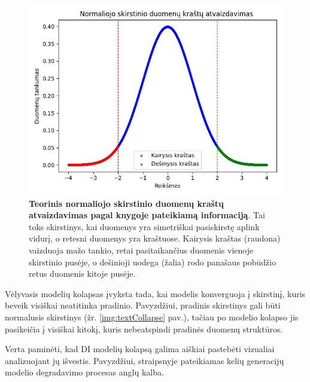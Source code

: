 \documentclass{VUMIFInfKursinis}
\begin{document}
\begin{figure}[H]
    \centering
    \includegraphics[scale=0.6]{img/normaliojo_skirstinio_grafikas.png}
    \caption{\textbf{Teorinis normaliojo skirstinio duomenų kraštų atvaizdavimas pagal \cite{Statistika} knygoje pateikiamą informaciją}. Tai toks skirstinys, kai duomenys yra simetriškai pasiskirstę aplink vidurį, o retesni duomenys yra kraštuose. \textcolor{raudona}{Kairysis kraštas (raudona)} vaizduoja mažo tankio, retai pasitaikančius duomenis vienoje skirstinio pusėje, o \textcolor{zalia}{dešinioji uodega (žalia)} rodo panašaus pobūdžio retus duomenis kitoje pusėje.}  
    \label{img:uodegos}
\end{figure}


Vėlyvasis modelių kolapsas įvyksta tada, kai modelis konverguoja į skirstinį, kuris beveik visiškai neatitinka pradinio. Pavyzdžiui, pradinis skirstinys gali būti normalusis skirstinys (žr. \ref{img:textCollapse} pav.), tačiau po modelio kolapso jis pasikeičia į visiškai kitokį, kuris nebeatspindi pradinės duomenų struktūros.





Verta paminėti, kad DI modelių kolapsą galima aiškiai pastebėti vizualiai analizuojant jų išvestis. Pavyzdžiui, straipsnyje \cite{AICollapseNature} pateikiamas kelių generacijų modelio degradavimo procesas anglų kalba. 
\end{document}
